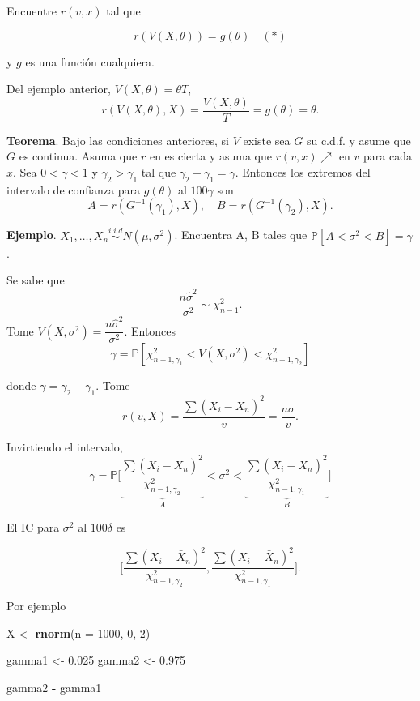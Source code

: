 \documentclass[
  12pt,
]{book}
\newenvironment{Shaded}{\begin{snugshade}}{\end{snugshade}}
\newcommand{\DataTypeTok}[1]{\textcolor[rgb]{0.13,0.29,0.53}{#1}}
\newcommand{\DecValTok}[1]{\textcolor[rgb]{0.00,0.00,0.81}{#1}}
\newcommand{\FloatTok}[1]{\textcolor[rgb]{0.00,0.00,0.81}{#1}}
\newcommand{\KeywordTok}[1]{\textcolor[rgb]{0.13,0.29,0.53}{\textbf{#1}}}
\newcommand{\NormalTok}[1]{#1}
\newcommand{\OperatorTok}[1]{\textcolor[rgb]{0.81,0.36,0.00}{\textbf{#1}}}
\newcommand{\StringTok}[1]{\textcolor[rgb]{0.31,0.60,0.02}{#1}}
\begin{document}
Encuentre \(r(v,x)\) tal que

\[r(V(X,\theta)) = g(\theta) \quad (*)\]

y \(g\) es una función cualquiera.

Del ejemplo anterior, \(V(X,\theta) = \theta T\), \[r(V(X,\theta),X) = \dfrac{V(X,\theta)}T
= g(\theta) = \theta.\]

\textbf{Teorema}. Bajo las condiciones anteriores, si \(V\) existe sea \(G\) su c.d.f. y
asume que \(G\) es continua. Asuma que \(r\) en es cierta y asuma que \(r(v,x) \nearrow\) en \(v\) para cada \(x\). Sea \(0<\gamma<1\) y \(\gamma_2>\gamma_1\) tal que \(\gamma_2-\gamma_1 = \gamma\). Entonces los extremos del intervalo de confianza para \(g(\theta)\) al
\(100\gamma\) son \[A=r(G^{-1}(\gamma_1),X), \quad B=r(G^{-1}(\gamma_2),X).\]

\textbf{Ejemplo}. \(X_1,\dots, X_n \stackrel{i.i.d}{\sim} N(\mu,\sigma^2)\). Encuentra A, B tales
que \(\mathbb P[A<\sigma^2<B] = \gamma\).

Se sabe que \[\dfrac{n\hat\sigma^2}{\sigma^2}\sim \chi^2_{n-1}.\] Tome \(V(X,\sigma^2) = \dfrac{n\hat\sigma^2}{\sigma^2}\). Entonces \[\gamma = \mathbb
P[\chi^2_{n-1,\gamma_1}<V(X,\sigma^2)<\chi^2_{n-1,\gamma_2}]\]

donde \(\gamma = \gamma_2-\gamma_1\). Tome \[r(v,X) =\dfrac{\sum(X_i -\bar X_n) ^2}{v} =
\dfrac{n\hat\sigma}{v}.\]

Invirtiendo el intervalo, \[\gamma = \mathbb P \bigg[ \underbrace{\dfrac{\sum(X_i -\bar
X_n) ^2}{\chi^2_{n-1,\gamma_2}}} _{A} <\sigma^2<\underbrace{\dfrac{\sum(X_i -\bar X_n)
^2}{\chi^2_{n-1,\gamma_1}}}_B\bigg]\]

El IC para \(\sigma^2\) al \(100\delta\) es

\[ \Bigg[ \dfrac{\sum(X_i -\bar X_n) ^2}{\chi^2_{n-1,\gamma_2}}, \dfrac{\sum(X_i -\bar X_n)
^2}{\chi^2_{n-1,\gamma_1}}\Bigg].\]

Por ejemplo

\begin{Shaded}
\begin{Highlighting}[]
\NormalTok{X \textless{}{-}}\StringTok{ }\KeywordTok{rnorm}\NormalTok{(}\DataTypeTok{n =} \DecValTok{1000}\NormalTok{, }\DecValTok{0}\NormalTok{, }\DecValTok{2}\NormalTok{)}

\NormalTok{gamma1 \textless{}{-}}\StringTok{ }\FloatTok{0.025}
\NormalTok{gamma2 \textless{}{-}}\StringTok{ }\FloatTok{0.975}

\NormalTok{gamma2 }\OperatorTok{{-}}\StringTok{ }\NormalTok{gamma1}
\end{Highlighting}
\end{Shaded}
\end{document}
